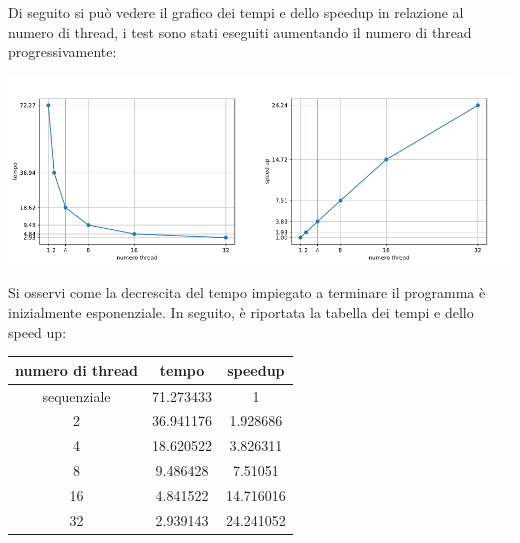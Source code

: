 \documentclass[12pt,openany]{report}
\begin{document}
Di seguito si può vedere il grafico dei tempi e dello speedup in relazione al numero di thread, i test sono stati eseguiti aumentando il numero di thread progressivamente:\begin{center}
\includegraphics[width=0.5\textwidth ]{images/tempi_OpenMP.pdf}\includegraphics[width=0.5\textwidth ]{images/speedup_OpenMP.pdf}
\end{center}
Si osservi come la decrescita del tempo impiegato a terminare il programma è inizialmente esponenziale. In seguito, è riportata la tabella dei tempi e dello speed up:\begin{center}
    \begin{tabular}{|c|c|c|}
        \hline
        \rowcolor[HTML]{EFEFEF} 
        numero di  thread & tempo     & speedup   \\ \hline
        sequenziale       & 71.273433 & 1         \\ \hline
        2                 & 36.941176 & 1.928686  \\ \hline
        4                 & 18.620522 & 3.826311  \\ \hline
        8                 & 9.486428  & 7.51051   \\ \hline
        16                & 4.841522  & 14.716016 \\ \hline
        32                & 2.939143  & 24.241052 \\ \hline
        \end{tabular}
\end{center}
\end{document}
